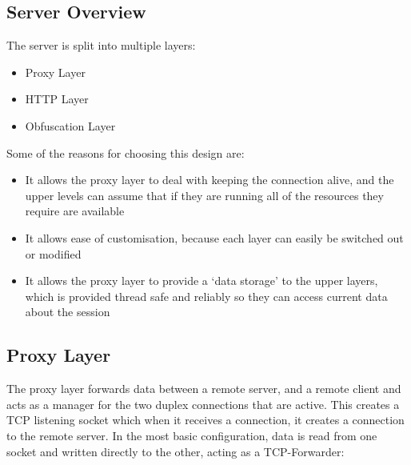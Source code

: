 \subsection{Server Overview}
The server is split into multiple layers:
\begin{itemize}
    \item Proxy Layer
    \item HTTP Layer
    \item Obfuscation Layer
\end{itemize}
Some of the reasons for choosing this design are:
\begin{itemize}
    \item It allows the proxy layer to deal with keeping the connection alive, and the upper levels can assume that if they are running all of the resources they require are available
    \item It allows ease of customisation, because each layer can easily be switched out or modified
    \item It allows the proxy layer to provide a `data storage' to the upper layers, which is provided thread safe and reliably so they can access current data about the session
\end{itemize}


\subsection{Proxy Layer}
The proxy layer forwards data between a remote server, and a remote client and acts as a manager for the two duplex connections that are active. This creates a TCP listening socket which when it receives a connection, it creates a connection to the remote server.
In the most basic configuration, data is read from one socket and written directly to the other, acting as a TCP-Forwarder:
\begin{center}
\end{center}

